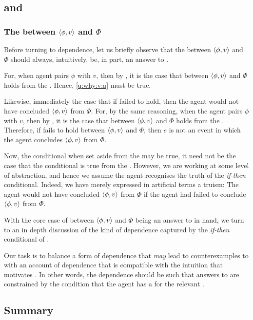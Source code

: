 \subsection{\qWhyVnP{} and \qWhyV{}}
\label{cha:var:expand:qWhy:variant}

\subsubsection{The \ros{} between \(\langle \phi, v \rangle\) and \(\Phi\)}

\begin{note}
  Before turning to dependence, let us briefly observe that the \ros{} between \(\langle \phi, v \rangle\) and \(\Phi\) should always, intuitively, be, in part, an answer to \qWhyV{}.

  For, when agent pairs \(\phi\) with \(v\), then by \supportI{}, it is the case that \ros{} between \(\langle \phi, v \rangle\) and \(\Phi\) holds from the \agpe{}.
  Hence, \ref{q:why:v:a} must be true.

  Likewise, immediately the case that if \support{} failed to hold, then the agent would not have concluded \(\langle \phi, v \rangle\) from \(\Phi\).
  For, by the same reasoning, when the agent pairs \(\phi\) with \(v\), then by \supportI{}, it is the case that \ros{} between \(\langle \phi, v \rangle\) and \(\Phi\) holds from the \agpe{}.
  Therefore, if \support{} fails to hold between \(\langle \phi, v \rangle\) and \(\Phi\), then \(e\) is not an event in which the agent concludes \(\langle \phi, v \rangle\) from \(\Phi\).

  Now, the conditional when set aside from the \agpe{} may be true, it need not be the case that the conditional is true from the \agpe{}.
  However, we are working at some level of abstraction, and hence we assume the agent recognises the truth of the \emph{if-then} conditional.
  Indeed, we have merely expressed in artificial terms a truism:
  The agent would not have concluded \(\langle \phi, v \rangle\) from \(\Phi\) if the agent had failed to conclude \(\langle \phi, v \rangle\) from \(\Phi\).
\end{note}

\begin{note}
  With the core case of \support{} between \(\langle \phi, v \rangle\) and \(\Phi\) being an answer to \qWhyV{} in hand, we turn to an in depth discussion of the kind of dependence captured by the \emph{if-then} conditional of \qWhyV{}.

  Our task is to balance a form of dependence that \emph{may} lead to counterexamples to \issueInclusion{} with an account of dependence that is compatible with the intuition that motivates \issueInclusion{}.
  In other words, the dependence should be such that answers to \qWhyV{} are constrained by the condition that the agent has a \wit{} for the relevant \ros{}.
\end{note}

\subsection{Summary}
\label{cha:var:expand:issue:summary}


